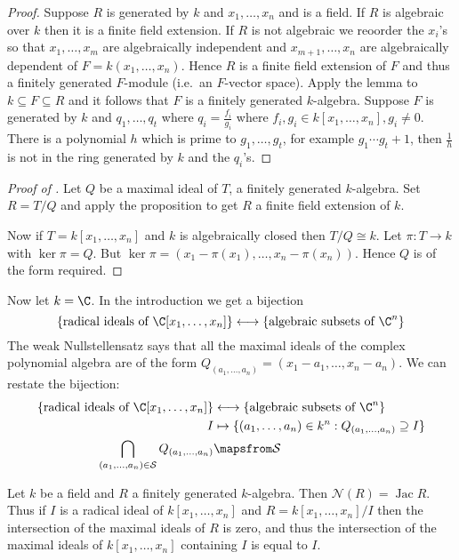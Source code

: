 \documentclass[a4paper]{article}
\newcommand{\nilrad}[1]{\mathcal{N}({#1})} %
\DeclareMathOperator{\jac}{Jac} %
\begin{document}
\begin{proof}
  Suppose \(R\) is generated by \(k\) and \(x_1, \dots, x_n\) and is a field. If \(R\) is algebraic over \(k\) then it is a finite field extension. If \(R\) is not algebraic we reoorder the \(x_i\)'s so that \(x_1, \dots, x_m\) are algebraically independent and \(x_{m + 1}, \dots, x_n\) are algebraically dependent of \(F = k(x_1, \dots, x_n)\). Hence \(R\) is a finite field extension of \(F\) and thus a finitely generated \(F\)-module (i.e.\ an \(F\)-vector space). Apply the lemma to \(k \subseteq F \subseteq R\) and it follows that \(F\) is a finitely generated \(k\)-algebra. Suppose \(F\) is generated by \(k\) and \(q_1, \dots, q_t\) where \(q_i = \frac{f_i}{g_i}\) where \(f_i, g_i \in k[x_1, \dots, x_n], g_i \neq 0\). There is a polynomial \(h\) which is prime to \(g_1, \dots, g_t\), for example \(g_1 \cdots g_t + 1\), then \(\frac{1}{h}\) is not in the ring generated by \(k\) and the \(q_i\)'s.
\end{proof}

\begin{proof}[Proof of ]
  Let \(Q\) be a maximal ideal of \(T\), a finitely generated \(k\)-algebra. Set \(R = T/Q\) and apply the proposition to get \(R\) a finite field extension of \(k\).

  Now if \(T = k[x_1, \dots, x_n]\) and \(k\) is algebraically closed then \(T/Q \cong k\). Let \(\pi: T \to k\) with \(\ker \pi = Q\). But \(\ker \pi = (x_1 - \pi(x_1), \dots, x_n - \pi(x_n))\). Hence \(Q\) is of the form required.
\end{proof}

Now let \(k = \C\). In the introduction we get a bijection
\[
  \{\text{radical ideals of } \C[x_1, \dots, x_n]\} \longleftrightarrow \{\text{algebraic subsets of } \C^n\}
\]
The weak Nullstellensatz says that all the maximal ideals of the complex polynomial algebra are of the form \(Q_{(a_1, \dots, a_n)} = (x_1 - a_1, \dots, x_n - a_n)\). We can restate the bijection:
\begin{align*}
  \{\text{radical ideals of } \C[x_1, \dots, x_n]\} &\longleftrightarrow \{\text{algebraic subsets of } \C^n\} \\
  I &\mapsto \{(a_1, \dots, a_n) \in k^n: Q_{(a_1, \dots, a_n)} \supseteq I\} \\
  \bigcap_{(a_1, \dots, a_n) \in \mathcal S} Q_{(a_1, \dots, a_n)} &\mapsfrom \mathcal S
\end{align*}

\begin{theorem}
  \label{thm:nilradical equals to Jacobson radical}
  Let \(k\) be a field and \(R\) a finitely generated \(k\)-algebra. Then \(\nilrad R = \jac R\). Thus if \(I\) is a radical ideal of \(k[x_1, \dots, x_n]\) and \(R = k[x_1, \dots, x_n]/I\) then the intersection of the maximal ideals of \(R\) is zero, and thus the intersection of the maximal ideals of \(k[x_1, \dots, x_n]\) containing \(I\) is equal to \(I\).
\end{theorem}
\end{document}
